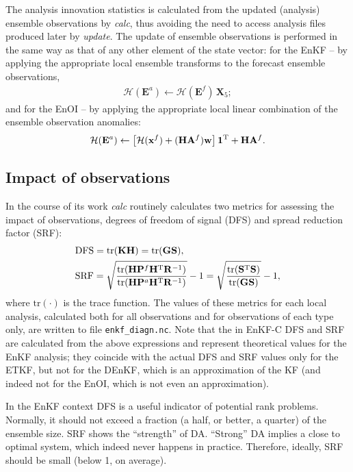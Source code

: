 \documentclass[11pt]{report}
\newcommand{\mb} {\mathbf}
\newcommand{\T}{^{\tiny \mathrm T}}
\begin{document}
The analysis innovation statistics is calculated from the updated (analysis) ensemble observations by \emph{calc}, thus avoiding the need to access analysis files produced later by \emph{update}.
The update of ensemble observations is performed in the same way as that of any other element of the state vector:
for the EnKF -- by applying the appropriate local ensemble transforms to the forecast ensemble observations,
\begin{align*}
  \mathcal H (\mb E^a) \leftarrow \mathcal H (\mb E^f) \, \mb X_5;
\end{align*}
and for the EnOI -- by applying the appropriate local linear combination of the ensemble observation anomalies:
\begin{align*}
  \mathcal H (\mb E^a) \leftarrow \left[ \mathcal H (\mb x^f) + (\mb H \mb A^f) \mb w\right] \mb 1\T + \mb H \mb A^f.
\end{align*}

\subsection{Impact of observations}
\label{sec:impact}

In the course of its work \emph{calc} routinely calculates two metrics for assessing the impact of observations, degrees of freedom of signal (DFS) and spread reduction factor (SRF):
\begin{align*}
  & \mathrm{DFS} = \mathrm{tr}(\mb K \mb H) = \mathrm{tr}(\mb G \mb S), \\
  & \mathrm{SRF} = \sqrt{\frac{\mathrm{tr}(\mb H \mb P^f \mb H\T \mb R^{-1})}{\mathrm{tr}(\mb H \mb P^a \mb H\T \mb R^{-1})}} - 1 = \sqrt{\frac{\mathrm{tr}(\mb S\T \mb S)}{\mathrm{tr}(\mb G \mb S)}} - 1,
\end{align*}
where $\mathrm{tr}(\cdot)$ is the trace function.
The values of these metrics for each local analysis, calculated both for all observations and for observations of each type only, are written to file \verb|enkf_diagn.nc|.
Note that the in EnKF-C DFS and SRF are calculated from the above expressions and represent theoretical values for the EnKF analysis; they coincide with the actual DFS and SRF values only for the ETKF, but not for the DEnKF, which is an approximation of the KF (and indeed not for the EnOI, which is not even an approximation).

In the EnKF context DFS is a useful indicator of potential rank problems.
Normally, it should not exceed a fraction (a half, or better, a quarter) of the ensemble size.
SRF shows the ``strength'' of DA.
``Strong'' DA implies a close to optimal system, which indeed never happens in practice.
Therefore, ideally, SRF should be small (below 1, on average).
\end{document}
